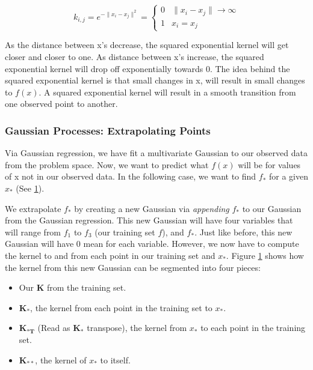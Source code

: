 \documentclass{sig-alternate}
\begin{document}
\[k_{i,j} = e^{-\|x_{i} - x_{j} \|^{2}} = 
    \begin{cases} 
      0 & \|x_{i} - x_{j} \| \rightarrow \infty\\
      1 & x_{i} = x_{j}
    \end{cases}\]
    
As the distance between x's decrease, the squared exponential kernel will get closer and closer to one.
As distance between x's increase, the squared exponential kernel will drop off exponentially towards 0.
The idea behind the squared exponential kernel is that small changes in x, will result in small changes to $f(x)$. A squared exponential kernel will result in a smooth transition from one observed point to another. 

\subsubsection{Gaussian Processes: Extrapolating Points}

Via Gaussian regression, we have fit a multivariate Gaussian to our observed data from the problem space.
Now, we want to predict what $f(x)$ will be for values of x not in our observed data.
In the following case, we want to find $f_{*}$ for a given $x_{*}$ (See \ref{fig:GPEXT}).

\begin{figure}[htb]
\centering
{}
\caption{}
\label{fig:GPEXT}
\end{figure}

We extrapolate $f_{*}$ by creating a new Gaussian via \textit{appending} $f_{*}$ to our Gaussian from the Gaussian regression.
This new Gaussian will have four variables that will range from $f_{1}$ to $f_{3}$ (our training set $f$), and $f_{*}$.
Just like before, this new Gaussian will have 0 mean for each variable.
However, we now have to compute the kernel to and from each point in our training set and $x_{*}$.
Figure \ref{fig:GPEXT} shows how the kernel from this new Gaussian can be segmented into four pieces:

 \begin{itemize}
   \item Our $\mathbf{K}$ from the training set.
   \item $\mathbf{K_{*}}$, the kernel from each point in the training set to $x_{*}$.
   \item $\mathbf{K_{*T}}$ (Read as $\mathbf{K_{*}}$ transpose), the kernel from $x_{*}$ to each point in the training set.
   \item $\mathbf{K_{**}}$, the kernel of $x_{*}$ to itself.
 \end{itemize}
 
\end{document}

